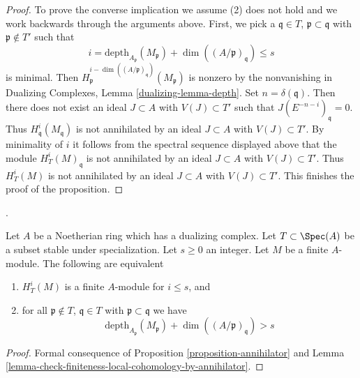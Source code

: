 \begin{proof}
\medskip\noindent
To prove the converse implication we assume (2) does not hold
and we work backwards through the arguments above. First, we pick a
$\mathfrak q \in T$, $\mathfrak p \subset \mathfrak q$
with $\mathfrak p \not \in T'$ such that
$$
i = \text{depth}_{A_\mathfrak p}(M_\mathfrak p) +
\dim((A/\mathfrak p)_\mathfrak q) \leq s
$$
is minimal. Then
$H^{i - \dim((A/\mathfrak p)_\mathfrak q)}_\mathfrak p(M_\mathfrak p)$
is nonzero by the nonvanishing in
Dualizing Complexes, Lemma \ref{dualizing-lemma-depth}.
Set $n = \delta(\mathfrak q)$. Then
there does not exist an ideal $J \subset A$ with $V(J) \subset T'$
such that $J(E^{-n - i})_\mathfrak q = 0$.
Thus $H^i_\mathfrak q(M_\mathfrak q)$ is not
annihilated by an ideal $J \subset A$ with $V(J) \subset T'$.
By minimality of $i$ it follows from the spectral sequence displayed above
that the module $H^i_T(M)_\mathfrak q$
is not annihilated by an ideal $J \subset A$
with $V(J) \subset T'$. Thus $H^i_T(M)$
is not annihilated by an ideal $J \subset A$
with $V(J) \subset T'$. This finishes the proof of the proposition.
\end{proof}

\begin{proposition}
\label{proposition-finiteness}
\begin{reference}
\cite{Faltings-annulators}.
\end{reference}
Let $A$ be a Noetherian ring which has a dualizing complex.
Let $T \subset \Spec(A)$ be a subset stable under specialization.
Let $s \geq 0$ an integer. Let $M$ be a finite $A$-module.
The following are equivalent
\begin{enumerate}
\item $H^i_T(M)$ is a finite $A$-module for $i \leq s$, and
\item for all $\mathfrak p \not \in T$, $\mathfrak q \in T$ with
$\mathfrak p \subset \mathfrak q$ we have
$$
\text{depth}_{A_\mathfrak p}(M_\mathfrak p) +
\dim((A/\mathfrak p)_\mathfrak q) > s
$$
\end{enumerate}
\end{proposition}

\begin{proof}
Formal consequence of Proposition \ref{proposition-annihilator} and
Lemma \ref{lemma-check-finiteness-local-cohomology-by-annihilator}.
\end{proof}

